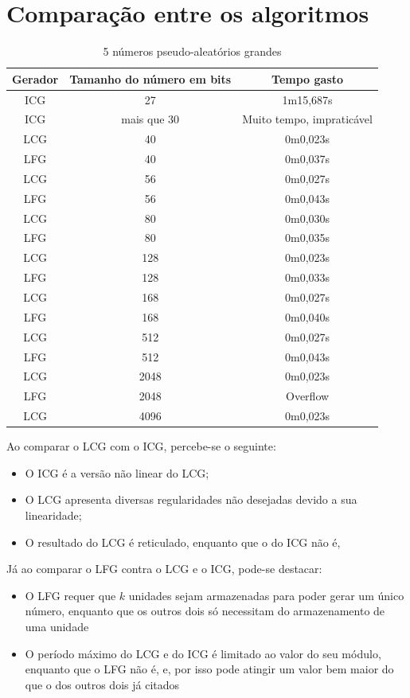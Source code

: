 \documentclass[12pt]{article}
\begin{document}
\section{Comparação entre os algoritmos}
\begin{table}[h]
  \centering
  \caption{5 números pseudo-aleatórios grandes}
  \begin{tabular}{|c|c|c|}
  \hline
  Gerador & Tamanho do número em bits & Tempo gasto  \\ \hline
  ICG     & 27 & 1m15,687s \\ \hline
  ICG     & mais que 30 & Muito tempo, impraticável \\ \hline
  LCG     & 40 & 0m0,023s  \\ \hline
  LFG     & 40 & 0m0,037s  \\ \hline
  LCG     & 56 & 0m0,027s  \\ \hline
  LFG     & 56 & 0m0,043s  \\ \hline
  LCG     & 80 & 0m0,030s  \\ \hline
  LFG     & 80 & 0m0,035s  \\ \hline
  LCG     & 128 & 0m0,023s  \\ \hline
  LFG     & 128 & 0m0,033s  \\ \hline
  LCG     & 168 & 0m0,027s  \\ \hline
  LFG     & 168 & 0m0,040s  \\ \hline
  LCG     & 512 & 0m0,027s  \\ \hline
  LFG     & 512 & 0m0,043s  \\ \hline
  LCG     & 2048 & 0m0,023s  \\ \hline
  LFG     & 2048 & Overflow \\ \hline
  LCG     & 4096 & 0m0,023s  \\ \hline
  \end{tabular}
\end{table}

Ao comparar o LCG com o ICG, percebe-se o seguinte:
\begin{itemize}
  \item O ICG é a versão não linear do LCG;
  \item O LCG apresenta diversas regularidades não desejadas devido a sua
  linearidade;
  \item O resultado do LCG é reticulado, enquanto que o do ICG não é,
\end{itemize}

Já ao comparar o LFG contra o LCG e o ICG, pode-se destacar:
\begin{itemize}
  \item O LFG requer que $k$ unidades sejam armazenadas para poder gerar um
  único número, enquanto que os outros dois só necessitam do armazenamento de
  uma unidade
  \item O período máximo do LCG e do ICG é limitado ao valor do seu módulo,
  enquanto que o LFG não é, e, por isso pode atingir um valor bem maior do que o
  dos outros dois já citados
\end{itemize}
\end{document}
